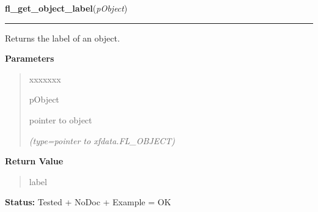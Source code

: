 \hspace{.8\funcindent}\begin{boxedminipage}{\funcwidth}

    \raggedright \textbf{fl\_get\_object\_label}(\textit{pObject})

    \vspace{-1.5ex}

    \rule{\textwidth}{0.5\fboxrule}
\setlength{\parskip}{2ex}
    Returns the label of an object.

\setlength{\parskip}{1ex}
      \textbf{Parameters}
      \vspace{-1ex}

      \begin{quote}
        \begin{Ventry}{xxxxxxx}

          \item[pObject]

          pointer to object

            {\it (type=pointer to xfdata.FL\_OBJECT)}

        \end{Ventry}

      \end{quote}

      \textbf{Return Value}
    \vspace{-1ex}

      \begin{quote}
      label

      \end{quote}

\textbf{Status:} Tested + NoDoc + Example = OK



    \end{boxedminipage}

    \label{xformslib:library:fl_set_object_helper}

    \vspace{0.5ex}

